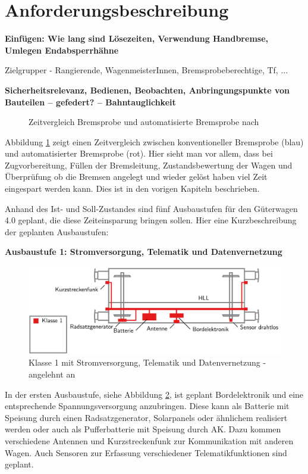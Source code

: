 \section{Anforderungsbeschreibung}
\textbf{Einfügen: Wie lang sind Lösezeiten, Verwendung Handbremse, Umlegen Endabsperrhähne}\par
Zielgrupper - Rangierende, WagenmeisterInnen, Bremsprobeberechtige, Tf, ...\par
\textbf{Sicherheitsrelevanz, Bedienen, Beobachten, Anbringungspunkte von Bauteilen -- gefedert? -- Bahntauglichkeit}\par
\begin{figure}[htbp] 
    
    \caption{Zeitvergleich Bremsprobe und automatisierte Bremsprobe nach \cite{Stephenson}}
    \label{fig:Zeitvergleich}
\end{figure} 
Abbildung \ref{fig:Zeitvergleich} zeigt einen Zeitvergleich zwischen konventioneller Bremsprobe (blau) und automatisierter Bremsprobe (rot). Hier sieht man vor allem, dass  bei Zugvorbereitung, Füllen der Bremsleitung, Zustandsbewertung der Wagen und Überprüfung ob die Bremsen angelegt und wieder gelöst haben viel Zeit eingespart werden kann. Dies ist in den vorigen Kapiteln beschrieben.\par
Anhand des Ist- und Soll-Zustandes sind fünf Ausbaustufen für den Güterwagen 4.0 geplant, die diese Zeiteinsparung bringen sollen. Hier eine Kurzbeschreibung der geplanten Ausbaustufen:\par
\textbf{Ausbaustufe 1: Stromversorgung, Telematik und Datenvernetzung}\par
\begin{figure}[hbp] 
    \includegraphics[width=\textwidth]{Bilder/Ausbaustufen_1.PNG}
    \caption{Klasse 1 mit Stromversorgung, Telematik und Datenvernetzung - angelehnt an \cite{Ausbaustufen} }
    \label{fig:Klasse1}
\end{figure} 
In der ersten Ausbaustufe, siehe Abbildung \ref{fig:Klasse1}, ist geplant Bordelektronik und eine entsprechende Spannungsversorgung anzubringen. Diese kann als Batterie mit Speisung durch einen Radsatzgenerator, Solarpanels oder ähnlichem realisiert werden oder auch als Pufferbatterie mit Speisung durch AK. Dazu kommen verschiedene Antennen und Kurzstreckenfunk zur Kommunikation mit anderen Wagen. Auch Sensoren zur Erfassung verschiedener Telematikfunktionen sind geplant.\par
